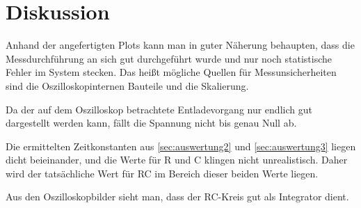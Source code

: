 \section{Diskussion}
\label{sec:Diskussion}

Anhand der angefertigten Plots kann man in guter Näherung behaupten, dass
die Messdurchführung an sich gut durchgeführt wurde und nur noch statistische
Fehler im System stecken.
Das heißt mögliche Quellen für Messunsicherheiten sind die Oszilloskopinternen
Bauteile und die Skalierung.

Da der auf dem Oszilloskop betrachtete Entladevorgang nur endlich gut
dargestellt werden kann, fällt die Spannung nicht bis genau Null ab.

Die ermittelten Zeitkonstanten aus \eqref{sec:auswertung2} und
\eqref{sec:auswertung3} liegen dicht beieinander, und die Werte für R und C
klingen nicht unrealistisch.
Daher wird der tatsächliche Wert für RC im Bereich dieser beiden Werte liegen.

Aus den Oszilloskopbilder sieht man, dass der RC-Kreis gut als Integrator dient.
